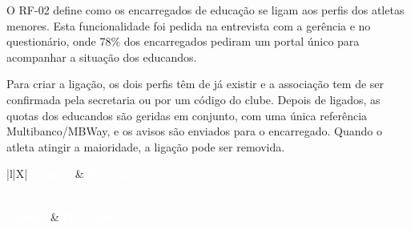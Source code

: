 O RF-02 define como os encarregados de educação se ligam aos perfis dos atletas menores. Esta funcionalidade foi pedida na entrevista com a gerência e no questionário, onde 78\% dos encarregados pediram um portal único para acompanhar a situação dos educandos.

Para criar a ligação, os dois perfis têm de já existir e a associação tem de ser confirmada pela secretaria ou por um código do clube. Depois de ligados, as quotas dos educandos são geridas em conjunto, com uma única referência Multibanco/MBWay, e os avisos são enviados para o encarregado. Quando o atleta atingir a maioridade, a ligação pode ser removida.

{\small
{}
\begin{xltabular}{\textwidth}{|l|X|}
\hline
{}\textcolor{white}{\textbf{Campo}} & \textcolor{white}{\textbf{Descrição}} \\ \hline
\endfirsthead

 \\
\hline
{}\textcolor{white}{\textbf{Campo}} & \textcolor{white}{\textbf{Descrição}} \\ \hline
\endhead

\hline {} \\ \hline \endfoot

\hline
\caption{Especificação do Requisito Funcional: RF-02}
\label{tab:rf-02} \\
\endlastfoot


\end{xltabular}}

